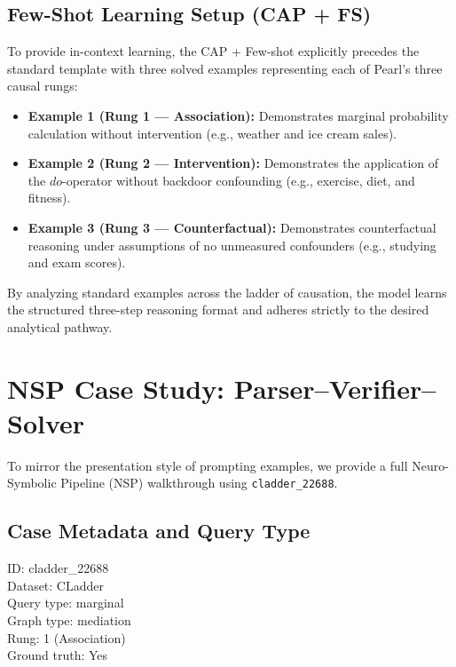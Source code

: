 \documentclass{article}
\theoremstyle{plain}
\theoremstyle{definition}
\theoremstyle{remark}
\begin{document}
\subsection{Few-Shot Learning Setup (CAP + FS)}
To provide in-context learning, the CAP + Few-shot explicitly precedes the standard template with three solved examples representing each of Pearl's three causal rungs:
\begin{itemize}
    \item \textbf{Example 1 (Rung 1 — Association):} Demonstrates marginal probability calculation without intervention (e.g., weather and ice cream sales).
    \item \textbf{Example 2 (Rung 2 — Intervention):} Demonstrates the application of the $do$-operator without backdoor confounding (e.g., exercise, diet, and fitness).
    \item \textbf{Example 3 (Rung 3 — Counterfactual):} Demonstrates counterfactual reasoning under assumptions of no unmeasured confounders (e.g., studying and exam scores).
\end{itemize}
By analyzing standard examples across the ladder of causation, the model learns the structured three-step reasoning format and adheres strictly to the desired analytical pathway.

\section{NSP Case Study: Parser--Verifier--Solver}
\label{appendix:nsp_example}

To mirror the presentation style of prompting examples, we provide a full Neuro-Symbolic Pipeline (NSP) walkthrough using \texttt{cladder\_22688}.

\subsection{Case Metadata and Query Type}
\begin{tcolorbox}[colback=white, colframe=black!75, title=Case Metadata: cladder\_22688]
\small
ID: cladder\_22688 \\
Dataset: CLadder \\
Query type: marginal \\
Graph type: mediation \\
Rung: 1 (Association) \\
Ground truth: Yes
\end{tcolorbox}
\end{document}

